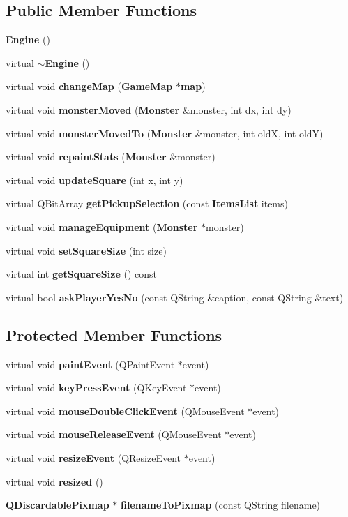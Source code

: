 \subsection*{Public Member Functions}
\begin{CompactItemize}
\item 
{\bf Engine} ()
\item 
virtual {\bf $\sim$Engine} ()
\item 
virtual void {\bf change\-Map} ({\bf Game\-Map} $\ast${\bf map})
\item 
virtual void {\bf monster\-Moved} ({\bf Monster} \&monster, int dx, int dy)
\item 
virtual void {\bf monster\-Moved\-To} ({\bf Monster} \&monster, int old\-X, int old\-Y)
\item 
virtual void {\bf repaint\-Stats} ({\bf Monster} \&monster)
\item 
virtual void {\bf update\-Square} (int x, int y)
\item 
virtual QBit\-Array {\bf get\-Pickup\-Selection} (const {\bf Items\-List} items)
\item 
virtual void {\bf manage\-Equipment} ({\bf Monster} $\ast$monster)
\item 
virtual void {\bf set\-Square\-Size} (int size)
\item 
virtual int {\bf get\-Square\-Size} () const 
\item 
virtual bool {\bf ask\-Player\-Yes\-No} (const QString \&caption, const QString \&text)
\end{CompactItemize}
\subsection*{Protected Member Functions}
\begin{CompactItemize}
\item 
virtual void {\bf paint\-Event} (QPaint\-Event $\ast$event)
\item 
virtual void {\bf key\-Press\-Event} (QKey\-Event $\ast$event)
\item 
virtual void {\bf mouse\-Double\-Click\-Event} (QMouse\-Event $\ast$event)
\item 
virtual void {\bf mouse\-Release\-Event} (QMouse\-Event $\ast$event)
\item 
virtual void {\bf resize\-Event} (QResize\-Event $\ast$event)
\item 
virtual void {\bf resized} ()
\item 
{\bf QDiscardable\-Pixmap} $\ast$ {\bf filename\-To\-Pixmap} (const QString filename)
\end{CompactItemize}
